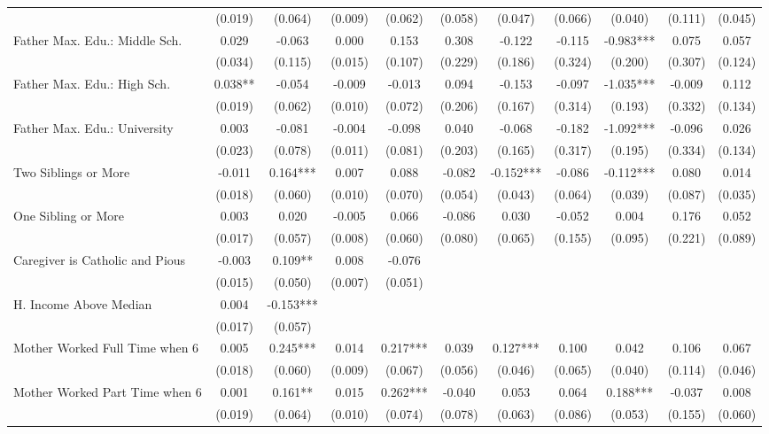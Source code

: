 \begin{tabular}{lcccccccccc}
 & (0.019) & (0.064) & (0.009) & (0.062) & (0.058) & (0.047) & (0.066) & (0.040) & (0.111) & (0.045) \\
Father Max. Edu.: Middle Sch. & 0.029 & -0.063 & 0.000 & 0.153 & 0.308 & -0.122 & -0.115 & -0.983*** & 0.075 & 0.057 \\
 & (0.034) & (0.115) & (0.015) & (0.107) & (0.229) & (0.186) & (0.324) & (0.200) & (0.307) & (0.124) \\
Father Max. Edu.: High Sch. & 0.038** & -0.054 & -0.009 & -0.013 & 0.094 & -0.153 & -0.097 & -1.035*** & -0.009 & 0.112 \\
 & (0.019) & (0.062) & (0.010) & (0.072) & (0.206) & (0.167) & (0.314) & (0.193) & (0.332) & (0.134) \\
Father Max. Edu.: University & 0.003 & -0.081 & -0.004 & -0.098 & 0.040 & -0.068 & -0.182 & -1.092*** & -0.096 & 0.026 \\
 & (0.023) & (0.078) & (0.011) & (0.081) & (0.203) & (0.165) & (0.317) & (0.195) & (0.334) & (0.134) \\
Two Siblings or More & -0.011 & 0.164*** & 0.007 & 0.088 & -0.082 & -0.152*** & -0.086 & -0.112*** & 0.080 & 0.014 \\
 & (0.018) & (0.060) & (0.010) & (0.070) & (0.054) & (0.043) & (0.064) & (0.039) & (0.087) & (0.035) \\
One Sibling or More & 0.003 & 0.020 & -0.005 & 0.066 & -0.086 & 0.030 & -0.052 & 0.004 & 0.176 & 0.052 \\
 & (0.017) & (0.057) & (0.008) & (0.060) & (0.080) & (0.065) & (0.155) & (0.095) & (0.221) & (0.089) \\
Caregiver is Catholic and Pious & -0.003 & 0.109** & 0.008 & -0.076 &  &  &  &  &  &  \\
 & (0.015) & (0.050) & (0.007) & (0.051) &  &  &  &  &  &  \\
H. Income Above Median & 0.004 & -0.153*** &  &  &  &  &  &  &  &  \\
 & (0.017) & (0.057) &  &  &  &  &  &  &  &  \\
Mother Worked Full Time when 6 & 0.005 & 0.245*** & 0.014 & 0.217*** & 0.039 & 0.127*** & 0.100 & 0.042 & 0.106 & 0.067 \\
 & (0.018) & (0.060) & (0.009) & (0.067) & (0.056) & (0.046) & (0.065) & (0.040) & (0.114) & (0.046) \\
Mother Worked Part Time when 6 & 0.001 & 0.161** & 0.015 & 0.262*** & -0.040 & 0.053 & 0.064 & 0.188*** & -0.037 & 0.008 \\
 & (0.019) & (0.064) & (0.010) & (0.074) & (0.078) & (0.063) & (0.086) & (0.053) & (0.155) & (0.060) \\

\end{tabular}
